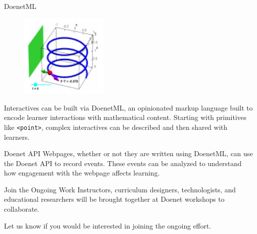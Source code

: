 \begin{sectionblock}{DoenetML}

  \begin{figure}
    \includegraphics[width=0.38\textwidth]{vector-field.pdf}
  \end{figure}
  Interactives can be built via DoenetML, an opinionated markup
  language built to encode learner interactions with mathematical
  content.  Starting with primitives like \texttt{<point>}, complex
  interactives can be described and then shared with learners.

\end{sectionblock}

\vspace{1ex}

\begin{sectionblock}{Doenet API}
  Webpages, whether or not they are written using DoenetML, can use
  the Doenet API to record events.  These events can be analyzed to
  understand how engagement with the webpage affects learning.
  
\end{sectionblock}

\vspace{1ex}

\begin{sectionblock}{Join the Ongoing Work}
  Instructors, curriculum designers, technologists, and educational
  researchers will be brought together at Doenet workshops to
  collaborate.

  \vspace{1ex}Let us know if you would be interested in joining the ongoing effort.
\end{sectionblock}


